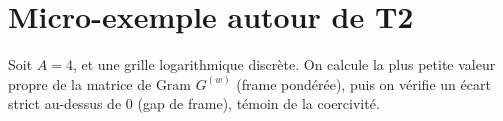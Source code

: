 \section{Micro-exemple autour de T2}
Soit $A=4$, et une grille logarithmique discrète. On calcule la plus petite
valeur propre de la matrice de Gram $G^{(w)}$ (frame pondérée), puis on vérifie
un écart strict au-dessus de $0$ (gap de frame), témoin de la coercivité.
